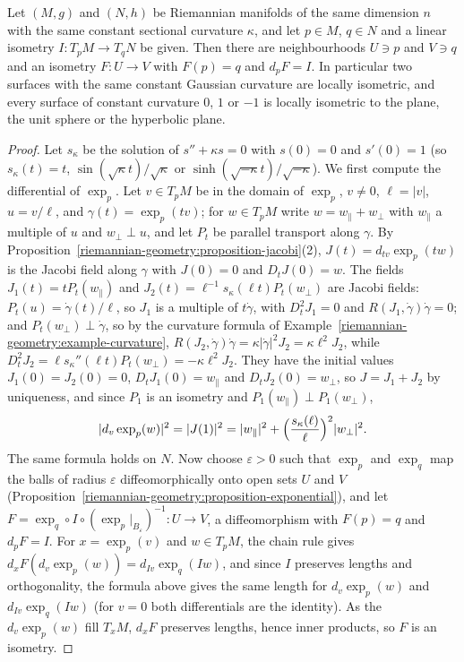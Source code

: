 \begin{theorem}\label{riemannian-geometry:theorem-minding}
Let $(M, g)$ and $(N, h)$ be Riemannian manifolds of the same dimension $n$ with the same constant sectional curvature $\kappa$, and let $p \in M$, $q \in N$ and a linear isometry
$I \colon T_pM \to T_qN$ be given. Then there are neighbourhoods $U \ni p$ and $V \ni q$ and an isometry $F \colon U \to V$ with $F(p) = q$ and $d_pF = I$. In particular two surfaces
with the same constant Gaussian curvature are locally isometric, and every surface of constant curvature $0$, $1$ or $-1$ is locally isometric to the plane, the unit sphere or the
hyperbolic plane.
\end{theorem}

\begin{proof}
Let $s_\kappa$ be the solution of $s'' + \kappa s = 0$ with $s(0) = 0$ and $s'(0) = 1$ (so $s_\kappa(t) = t$, $\sin(\sqrt\kappa t)/\sqrt\kappa$ or $\sinh(\sqrt{-\kappa}t)/\sqrt{-\kappa}$). We
first compute the differential of $\exp_p$. Let $v \in T_pM$ be in the domain of $\exp_p$, $v \neq 0$, $\ell = |v|$, $u = v/\ell$, and $\gamma(t) = \exp_p(tv)$; for $w \in T_pM$ write
$w = w_\parallel + w_\perp$ with $w_\parallel$ a multiple of $u$ and $w_\perp \perp u$, and let $P_t$ be parallel transport along $\gamma$. By
Proposition~\ref{riemannian-geometry:proposition-jacobi}(2), $J(t) = d_{tv}\exp_p(tw)$ is the Jacobi field along $\gamma$ with $J(0) = 0$ and $D_tJ(0) = w$. The fields
$J_1(t) = tP_t(w_\parallel)$ and $J_2(t) = \ell^{-1}s_\kappa(\ell t)P_t(w_\perp)$ are Jacobi fields: $P_t(u) = \dot\gamma(t)/\ell$, so $J_1$ is a multiple of $t\dot\gamma$, with $D_t^2J_1 = 0$ and
$R(J_1, \dot\gamma)\dot\gamma = 0$; and $P_t(w_\perp) \perp \dot\gamma$, so by the curvature formula of Example~\ref{riemannian-geometry:example-curvature},
$R(J_2, \dot\gamma)\dot\gamma = \kappa|\dot\gamma|^2J_2 = \kappa\ell^2J_2$, while $D_t^2J_2 = \ell s_\kappa''(\ell t)P_t(w_\perp) = -\kappa\ell^2J_2$. They have the initial values $J_1(0) = J_2(0) = 0$,
$D_tJ_1(0) = w_\parallel$ and $D_tJ_2(0) = w_\perp$, so $J = J_1 + J_2$ by uniqueness, and since $P_1$ is an isometry and $P_1(w_\parallel) \perp P_1(w_\perp)$,
\[
|d_v\exp_p(w)|^2 = |J(1)|^2 = |w_\parallel|^2 + \Bigl(\frac{s_\kappa(\ell)}{\ell}\Bigr)^2|w_\perp|^2.
\]
The same formula holds on $N$. Now choose $\varepsilon > 0$ such that $\exp_p$ and $\exp_q$ map the balls of radius $\varepsilon$ diffeomorphically onto open sets $U$ and $V$
(Proposition~\ref{riemannian-geometry:proposition-exponential}), and let $F = \exp_q \circ I \circ (\exp_p|_{B_\varepsilon})^{-1} \colon U \to V$, a diffeomorphism with $F(p) = q$ and $d_pF = I$.
For $x = \exp_p(v)$ and $w \in T_pM$, the chain rule gives $d_xF(d_v\exp_p(w)) = d_{Iv}\exp_q(Iw)$, and since $I$ preserves lengths and orthogonality, the formula above gives the same
length for $d_v\exp_p(w)$ and $d_{Iv}\exp_q(Iw)$ (for $v = 0$ both differentials are the identity). As the $d_v\exp_p(w)$ fill $T_xM$, $d_xF$ preserves lengths, hence inner products, so $F$
is an isometry.
\end{proof}

